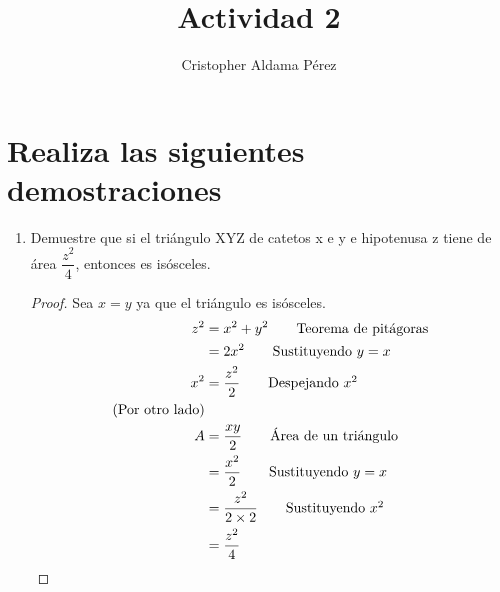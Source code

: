 \documentclass[a4paper,10pt]{article}
\title{Actividad 2}
\author{Cristopher Aldama Pérez}
\begin{document}
\maketitle

\section{Realiza las siguientes demostraciones}

\begin{enumerate}
 \item Demuestre que si el triángulo XYZ de catetos x e y e hipotenusa z tiene de área \( \dfrac{z^{2}}{4} \), entonces es isósceles.
   \begin{proof}
     Sea \( x = y\) ya que el triángulo es isósceles.
     \begin{align*}
       z^{2} &= x^{2} + y^{2}               \tag*{Teorema de pitágoras}
       \\ &= 2x^{2}                         \tag*{Sustituyendo $y = x$}
       \\ x^{2} &= \dfrac{z^{2}}{2}         \tag*{Despejando $x^{2}$}
       \\                                   \tag{Por otro lado}
       \\ A &= \dfrac{xy}{2}                \tag*{Área de un triángulo}
       \\ &= \dfrac{x^{2}}{2}               \tag*{Sustituyendo $y = x$}
       \\ &= \dfrac{z^2}{2\times2}    \tag*{Sustituyendo $x^{2}$}
       \\ &= \dfrac{z^{2}}{4}               &&\qedhere
    \end{align*}
   \end{proof}
   

\end{enumerate}
\end{document}
